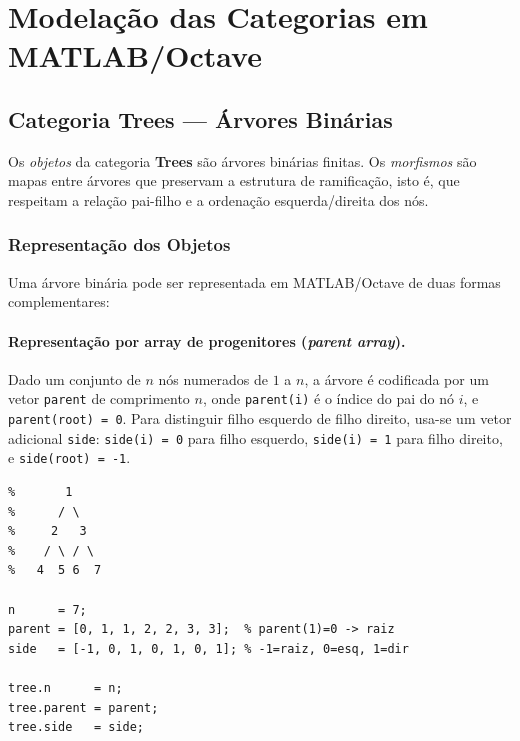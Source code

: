 \section{Modelação das Categorias em MATLAB/Octave}
\label{sec:modeling}

\subsection{Categoria \textbf{Trees} --- Árvores Binárias}
\label{subsec:trees}

\begin{definition}
Os \emph{objetos} da categoria \textbf{Trees} são árvores binárias finitas. Os \emph{morfismos} são mapas entre árvores que preservam a estrutura de ramificação, isto é, que respeitam a relação pai-filho e a ordenação esquerda/direita dos nós.
\end{definition}

\subsubsection{Representação dos Objetos}

Uma árvore binária pode ser representada em MATLAB/Octave de duas formas complementares:

\paragraph{Representação por array de progenitores (\textit{parent array}).}
Dado um conjunto de $n$ nós numerados de $1$ a $n$, a árvore é codificada por um vetor \texttt{parent} de comprimento $n$, onde \texttt{parent(i)} é o índice do pai do nó $i$, e \texttt{parent(root) = 0}. Para distinguir filho esquerdo de filho direito, usa-se um vetor adicional \texttt{side}: \texttt{side(i) = 0} para filho esquerdo, \texttt{side(i) = 1} para filho direito, e \texttt{side(root) = -1}.

\begin{lstlisting}[style=matlab, caption={Representação de uma árvore binária por array de progenitores}]
% Arvore com 7 nos: raiz=1, filhos esquerdos/direitos indicados
%       1
%      / \
%     2   3
%    / \ / \
%   4  5 6  7

n      = 7;
parent = [0, 1, 1, 2, 2, 3, 3];  % parent(1)=0 -> raiz
side   = [-1, 0, 1, 0, 1, 0, 1]; % -1=raiz, 0=esq, 1=dir

tree.n      = n;
tree.parent = parent;
tree.side   = side;
\end{lstlisting}

